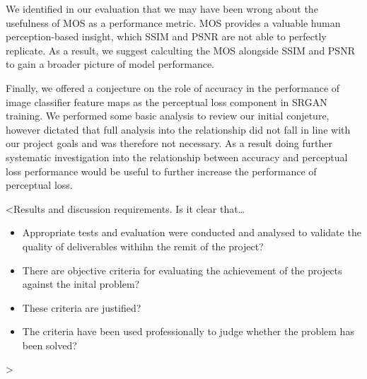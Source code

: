 We identified in our evaluation that we may have been wrong about the usefulness of MOS as a performance metric. MOS provides a valuable human perception-based insight, which SSIM and PSNR are not able to perfectly replicate. As a result, we suggest calculting the MOS alongside SSIM and PSNR to gain a broader picture of model performance.

Finally, we offered a conjecture on the role of accuracy in the performance of image classifier feature maps as the perceptual loss component in SRGAN training. We performed some basic analysis to review our initial conjeture, however dictated that full analysis into the relationship did not fall in line with our project goals and was therefore not necessary. As a result doing further systematic investigation into the relationship between accuracy and perceptual loss performance would be useful to further increase the performance of perceptual loss.

<Results and discussion requirements. Is it clear that\dots
\begin{itemize}
    \item Appropriate tests and evaluation were conducted and analysed to validate the quality of deliverables withihn the remit of the project?
    \item There are objective criteria for evaluating the achievement of the projects against the inital problem?
    \item These criteria are justified?
    \item The criteria have been used professionally to judge whether the problem has been solved?
\end{itemize}
>
